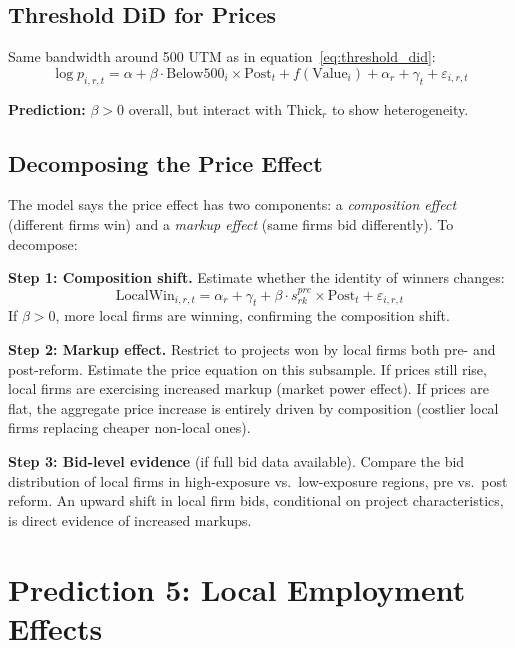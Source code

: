 \documentclass[12pt]{article}
\begin{document}
\subsection{Threshold DiD for Prices}

Same bandwidth around 500 UTM as in equation~\eqref{eq:threshold_did}:
\begin{equation}\label{eq:price_threshold}
    \log p_{i,r,t} = \alpha + \beta \cdot \text{Below500}_i \times \text{Post}_t + f(\text{Value}_i) + \alpha_r + \gamma_t + \varepsilon_{i,r,t}
\end{equation}

\textbf{Prediction:} $\beta > 0$ overall, but interact with $\text{Thick}_r$ to show heterogeneity.

\subsection{Decomposing the Price Effect}

The model says the price effect has two components: a \emph{composition effect} (different firms win) and a \emph{markup effect} (same firms bid differently). To decompose:

\medskip
\noindent \textbf{Step 1: Composition shift.} Estimate whether the identity of winners changes:
\begin{equation}\label{eq:local_win}
    \text{LocalWin}_{i,r,t} = \alpha_r + \gamma_t + \beta \cdot s_{rk}^{pre} \times \text{Post}_t + \varepsilon_{i,r,t}
\end{equation}
If $\beta > 0$, more local firms are winning, confirming the composition shift.

\medskip
\noindent \textbf{Step 2: Markup effect.} Restrict to projects won by local firms both pre- and post-reform. Estimate the price equation on this subsample. If prices still rise, local firms are exercising increased markup (market power effect). If prices are flat, the aggregate price increase is entirely driven by composition (costlier local firms replacing cheaper non-local ones).

\medskip
\noindent \textbf{Step 3: Bid-level evidence} (if full bid data available). Compare the bid distribution of local firms in high-exposure vs.\ low-exposure regions, pre vs.\ post reform. An upward shift in local firm bids, conditional on project characteristics, is direct evidence of increased markups.

\section{Prediction 5: Local Employment Effects}
\end{document}
